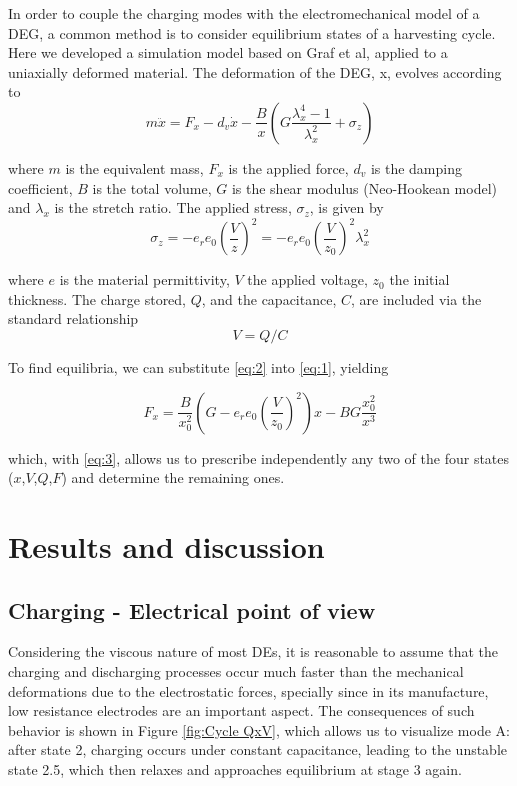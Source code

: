 In order to couple the charging modes with the electromechanical model of a DEG, a common method is to consider equilibrium states of a harvesting cycle\cite{Shian2014OptimizingGenerators,RN73,RN32}. Here we developed a simulation model based on Graf et al\cite{RN73}, applied to a uniaxially deformed material. The deformation of the DEG, x, evolves according to
\begin{equation} \label{eq:1}
m \ddot{x} = F_x- d_v \dot{x} -  \frac{B}{x} \left( G \frac{\lambda_x^4-1}{\lambda_x^2} +\sigma_z \right)
\end{equation}


where $m$ is the equivalent mass, $F_x$ is the applied force, $d_v$ is the damping coefficient, $B$ is the total volume, $G$ is the shear modulus (Neo-Hookean model) and $λ_x$ is the stretch ratio. The applied stress, $\sigma_z$, is given by
\begin{equation} \label{eq:2}
\sigma_z = -e_r e_0 \left(\frac{V}{z}\right)^2 = -e_r e_0 \left(\frac{V}{z_0} \right)^2 \lambda_x^2
\end{equation}


where $e$ is the material permittivity, $V$ the applied voltage, $z_0$ the initial thickness. The charge stored, $Q$, and the capacitance, $C$, are included via the standard relationship
\begin{equation} \label{eq:3}
V=Q/C
\end{equation}

To find equilibria, we can substitute \ref{eq:2} into \ref{eq:1}, yielding

\begin{equation} \label{eq:4}
F_x =   \frac{B}{x_0^2}  \left(G-e_r e_0 \left(\frac{V}{z_0} \right)^2 \right)x-B G \frac{x_0^2}{x^3}  
\end{equation}

which, with \ref{eq:3}, allows us to prescribe independently any two of the four states ($x$,$V$,$Q$,$F$) and determine the remaining ones.

\section{Results and discussion}
\label{sec:results}

\subsection{Charging - Electrical point of view}
\label{subsec:charging}
Considering the viscous nature of most DEs, it is reasonable to assume that the charging and discharging processes occur much faster than the mechanical deformations due to the electrostatic forces, specially since in its manufacture, low resistance electrodes are an important aspect. The consequences of such behavior is shown in Figure \ref{fig:Cycle QxV}, which allows us to visualize mode A: after state 2, charging occurs under constant capacitance, leading to the unstable state 2.5\textquotesingle, which then relaxes and approaches equilibrium at stage 3 again.


